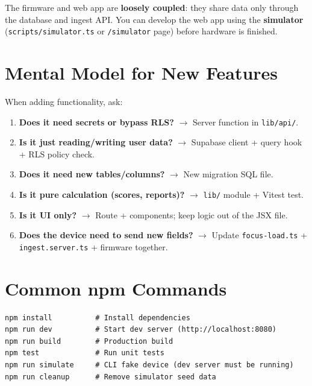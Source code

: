 \documentclass[11pt,a4paper]{article}
\newcommand{\filepath}[1]{\texttt{#1}}
\begin{document}
The firmware and web app are \textbf{loosely coupled}: they share data only through the database and ingest API. You can develop the web app using the \textbf{simulator} (\filepath{scripts/simulator.ts} or \filepath{/simulator} page) before hardware is finished.

\section{Mental Model for New Features}

When adding functionality, ask:

\begin{enumerate}[leftmargin=*]
  \item \textbf{Does it need secrets or bypass RLS?} $\rightarrow$ Server function in \filepath{lib/api/}.
  \item \textbf{Is it just reading/writing user data?} $\rightarrow$ Supabase client + query hook + RLS policy check.
  \item \textbf{Does it need new tables/columns?} $\rightarrow$ New migration SQL file.
  \item \textbf{Is it pure calculation (scores, reports)?} $\rightarrow$ \filepath{lib/} module + Vitest test.
  \item \textbf{Is it UI only?} $\rightarrow$ Route + components; keep logic out of the JSX file.
  \item \textbf{Does the device need to send new fields?} $\rightarrow$ Update \filepath{focus-load.ts} + \filepath{ingest.server.ts} + firmware together.
\end{enumerate}

\section{Common npm Commands}

\begin{lstlisting}
npm install          # Install dependencies
npm run dev          # Start dev server (http://localhost:8080)
npm run build        # Production build
npm test             # Run unit tests
npm run simulate     # CLI fake device (dev server must be running)
npm run cleanup      # Remove simulator seed data
\end{lstlisting}
\end{document}
